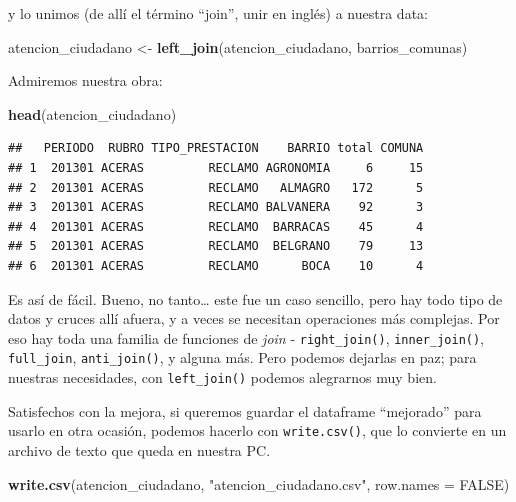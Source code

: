 \documentclass[spanish,]{book}
\newenvironment{Shaded}{\begin{snugshade}}{\end{snugshade}}
\newcommand{\DataTypeTok}[1]{\textcolor[rgb]{0.13,0.29,0.53}{#1}}
\newcommand{\KeywordTok}[1]{\textcolor[rgb]{0.13,0.29,0.53}{\textbf{#1}}}
\newcommand{\NormalTok}[1]{#1}
\newcommand{\OtherTok}[1]{\textcolor[rgb]{0.56,0.35,0.01}{#1}}
\newcommand{\StringTok}[1]{\textcolor[rgb]{0.31,0.60,0.02}{#1}}
\begin{document}
y lo unimos (de allí el término ``join'', unir en inglés) a nuestra data:

\begin{Shaded}
\begin{Highlighting}[]
\NormalTok{atencion_ciudadano <-}\StringTok{ }\KeywordTok{left_join}\NormalTok{(atencion_ciudadano, barrios_comunas)}
\end{Highlighting}
\end{Shaded}

Admiremos nuestra obra:

\begin{Shaded}
\begin{Highlighting}[]
\KeywordTok{head}\NormalTok{(atencion_ciudadano)}
\end{Highlighting}
\end{Shaded}

\begin{verbatim}
##   PERIODO  RUBRO TIPO_PRESTACION    BARRIO total COMUNA
## 1  201301 ACERAS         RECLAMO AGRONOMIA     6     15
## 2  201301 ACERAS         RECLAMO   ALMAGRO   172      5
## 3  201301 ACERAS         RECLAMO BALVANERA    92      3
## 4  201301 ACERAS         RECLAMO  BARRACAS    45      4
## 5  201301 ACERAS         RECLAMO  BELGRANO    79     13
## 6  201301 ACERAS         RECLAMO      BOCA    10      4
\end{verbatim}

Es así de fácil. Bueno, no tanto\ldots{} este fue un caso sencillo, pero hay todo tipo de datos y cruces allí afuera, y a veces se necesitan operaciones más complejas. Por eso hay toda una familia de funciones de \emph{join} - \texttt{right\_join()}, \texttt{inner\_join()}, \texttt{full\_join}, \texttt{anti\_join()}, y alguna más. Pero podemos dejarlas en paz; para nuestras necesidades, con \texttt{left\_join()} podemos alegrarnos muy bien.

Satisfechos con la mejora, si queremos guardar el dataframe ``mejorado'' para usarlo en otra ocasión, podemos hacerlo con \texttt{write.csv()}, que lo convierte en un archivo de texto que queda en nuestra PC.

\begin{Shaded}
\begin{Highlighting}[]
\KeywordTok{write.csv}\NormalTok{(atencion_ciudadano, }\StringTok{"atencion_ciudadano.csv"}\NormalTok{, }\DataTypeTok{row.names =} \OtherTok{FALSE}\NormalTok{)}
\end{Highlighting}
\end{Shaded}
\end{document}
